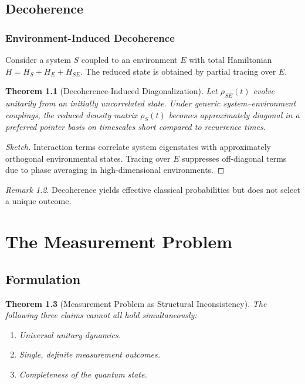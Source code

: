 \documentclass[12pt]{book}
\theoremstyle{plain}
\newtheorem{theorem}{Theorem}[chapter]
\theoremstyle{definition}
\theoremstyle{remark}
\newtheorem{remark}[theorem]{Remark}
\begin{document}
\chapter{Decoherence}

\section{Environment-Induced Decoherence}

Consider a system $S$ coupled to an environment $E$ with total Hamiltonian $H = H_S + H_E + H_{SE}$. The reduced state is obtained by partial tracing over $E$.

\begin{theorem}[Decoherence-Induced Diagonalization]
Let $\rho_{SE}(t)$ evolve unitarily from an initially uncorrelated state. Under generic system--environment couplings, the reduced density matrix $\rho_S(t)$ becomes approximately diagonal in a preferred pointer basis on timescales short compared to recurrence times.
\end{theorem}

\begin{proof}[Sketch]
Interaction terms correlate system eigenstates with approximately orthogonal environmental states. Tracing over $E$ suppresses off-diagonal terms due to phase averaging in high-dimensional environments.
\end{proof}

\begin{remark}
Decoherence yields effective classical probabilities but does not select a unique outcome.
\end{remark}

\part{The Measurement Problem}

\chapter{Formulation}

\begin{theorem}[Measurement Problem as Structural Inconsistency]
The following three claims cannot all hold simultaneously:
\begin{enumerate}[label=(\roman*)]
\item Universal unitary dynamics.
\item Single, definite measurement outcomes.
\item Completeness of the quantum state.
\end{enumerate}
\end{theorem}
\end{document}
